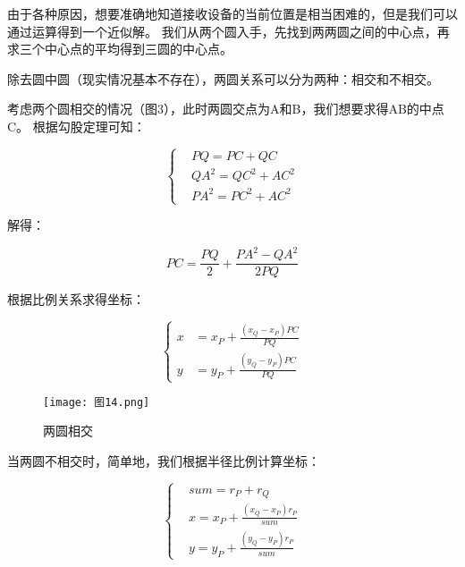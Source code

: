\documentclass{article}
\begin{document}
由于各种原因，想要准确地知道接收设备的当前位置是相当困难的，但是我们可以通过运算得到一个近似解。
我们从两个圆入手，先找到两两圆之间的中心点，再求三个中心点的平均得到三圆的中心点。

除去圆中圆（现实情况基本不存在），两圆关系可以分为两种：相交和不相交。

考虑两个圆相交的情况（图3），此时两圆交点为A和B，我们想要求得AB的中点C。
根据勾股定理可知：

\begin{equation}\label{q}
	\left\{
        \begin{aligned}
            &PQ=PC+QC  \\
            &{QA}^{2}={QC}^{2}+{AC}^{2} \\
            &{PA}^{2}={PC}^{2}+{AC}^{2}
        \end{aligned}
    \right.
\end{equation}

解得：

\begin{equation}\label{w}
	PC = \frac{PQ}{2} + \frac{{PA}^{2}-{QA}^{2}}{2PQ}
\end{equation}

根据比例关系求得坐标：

\begin{equation}\label{e}
    \left\{
        \begin{aligned}
            x&={x}_{P} + \frac{({x}_{Q}-{x}_{P})PC}{PQ}  \\
            y&={y}_{P} + \frac{({y}_{Q}-{y}_{P})PC}{PQ}
        \end{aligned}
    \right.
\end{equation}

\begin{figure}[ht] %

    \centering

    \texttt{[image: 图14.png]}

    \caption{两圆相交}

    \label{fig:m}

\end{figure}

当两圆不相交时，简单地，我们根据半径比例计算坐标：

\begin{equation}\label{r}
    \left\{
        \begin{aligned}
            &sum={r}_{P} + {r}_{Q} \\
            &x={x}_{P} + \frac{({x}_{Q}-{x}_{P}){r}_{P}}{sum}  \\
            &y={y}_{P} + \frac{({y}_{Q}-{y}_{P}){r}_{P}}{sum}
        \end{aligned}
    \right.	
\end{equation}
\end{document}
